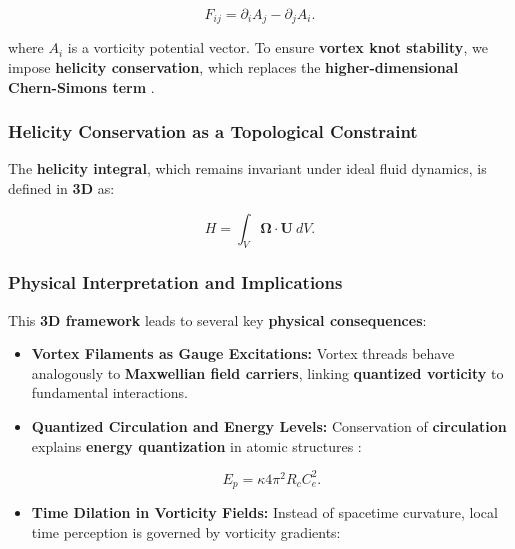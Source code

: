 \documentclass[a4paper,10pt]{article}
\begin{document}
    \begin{equation*}
        F_{ij} = \partial_i A_j - \partial_j A_i.
    \end{equation*}

    where \( A_i \) is a vorticity potential vector. To ensure \textbf{vortex knot stability}, we impose \textbf{helicity conservation}, which replaces the \textbf{higher-dimensional Chern-Simons term} \cite{witten1989quantum}.

    \subsubsection*{Helicity Conservation as a Topological Constraint}
    The \textbf{helicity integral}, which remains invariant under ideal fluid dynamics, is defined in \textbf{3D} as:

    \begin{equation*}
        H = \int_V \boldsymbol{\Omega} \cdot \mathbf{U} \ dV.
    \end{equation*}

    \subsubsection*{Physical Interpretation and Implications}
    This \textbf{3D framework} leads to several key \textbf{physical consequences}:

    \begin{itemize}
        \item \textbf{Vortex Filaments as Gauge Excitations:}
        Vortex threads behave analogously to \textbf{Maxwellian field carriers}, linking \textbf{quantized vorticity} to fundamental interactions.

        \item \textbf{Quantized Circulation and Energy Levels:}
        Conservation of \textbf{circulation} explains \textbf{energy quantization} in atomic structures \cite{feynman1951quantum}:

        \begin{equation*}
            E_p = \kappa 4\pi^2 R_c C_e^2.
        \end{equation*}

        \item \textbf{Time Dilation in Vorticity Fields:}
        Instead of spacetime curvature, local time perception is governed by vorticity gradients:


\end{itemize}
\end{document}
